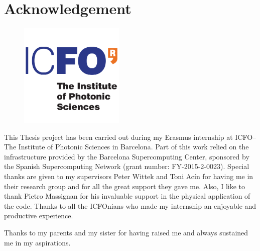 \thispagestyle{empty}
\chapter*{Acknowledgement}

\begin{figure}[h!]
\centering
   \includegraphics[width=5cm]{Figs/logo_icfo.png}
\end{figure}

\noindent This Thesis project has been carried out during my Erasmus internship at ICFO--The Institute of Photonic Sciences in Barcelona. Part of this work relied on the infrastructure provided by the Barcelona Supercomputing Center, sponsored by the Spanish Supercomputing Network (grant number: FY-2015-2-0023). Special thanks are given to my supervisors Peter Wittek and Toni Acín for having me in their research group and for all the great support they gave me.
Also, I like to thank Pietro Massignan for his invaluable support in the physical application of the code.
Thanks to all the ICFOnians who made my internship an enjoyable and productive experience. 

\vspace{1cm}

\noindent Thanks to my parents and my sister for having raised me and always sustained me in my aspirations.